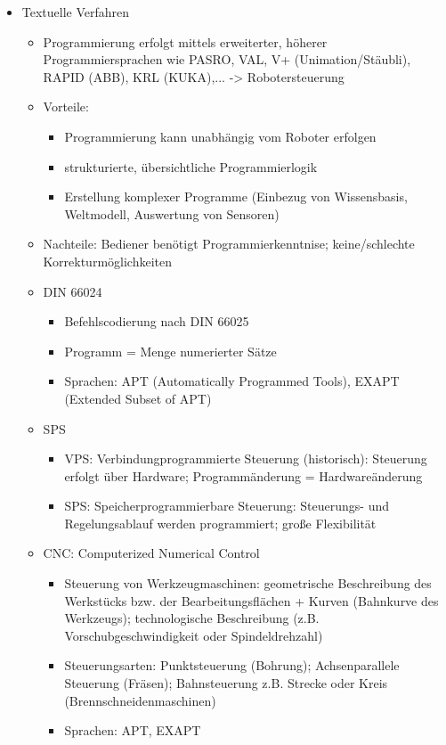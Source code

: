 \documentclass[paper=a4, fontsize=11pt]{scrartcl} %
\numberwithin{equation}{section} %
\numberwithin{figure}{section} %
\numberwithin{table}{section} %
\begin{document}
\begin{enumerate}
\begin{itemize}
\begin{itemize}
\end{itemize}
\item Textuelle Verfahren
\begin{itemize}
\item Programmierung erfolgt mittels erweiterter, höherer Programmiersprachen wie PASRO, VAL, V+ (Unimation/Stäubli), RAPID (ABB), KRL (KUKA),... -> Robotersteuerung
\item Vorteile:
\begin{itemize}
\item Programmierung kann unabhängig vom Roboter erfolgen
\item strukturierte, übersichtliche Programmierlogik
\item Erstellung komplexer Programme (Einbezug von Wissensbasis, Weltmodell, Auswertung von Sensoren)
\end{itemize}
\item Nachteile: Bediener benötigt Programmierkenntnise; keine/schlechte Korrekturmöglichkeiten
\item DIN 66024
\begin{itemize}
\item Befehlscodierung nach DIN 66025
\item Programm = Menge numerierter Sätze
\item Sprachen: APT (Automatically Programmed Tools), EXAPT (Extended Subset of APT)
\end{itemize}
\item SPS
\begin{itemize}
\item VPS: Verbindungprogrammierte Steuerung (historisch): Steuerung erfolgt über Hardware; Programmänderung = Hardwareänderung
\item SPS: Speicherprogrammierbare Steuerung: Steuerungs- und Regelungsablauf werden programmiert; große Flexibilität
\end{itemize}
\item CNC: Computerized Numerical Control
\begin{itemize}
\item Steuerung von Werkzeugmaschinen: geometrische Beschreibung des Werkstücks bzw. der Bearbeitungsflächen + Kurven (Bahnkurve des Werkzeugs); technologische Beschreibung (z.B. Vorschubgeschwindigkeit oder Spindeldrehzahl)
\item Steuerungsarten: Punktsteuerung (Bohrung); Achsenparallele Steuerung (Fräsen); Bahnsteuerung z.B. Strecke oder Kreis (Brennschneidenmaschinen)
\item Sprachen: APT, EXAPT

\end{itemize}
\end{itemize}
\end{itemize}
\end{enumerate}
\end{document}
